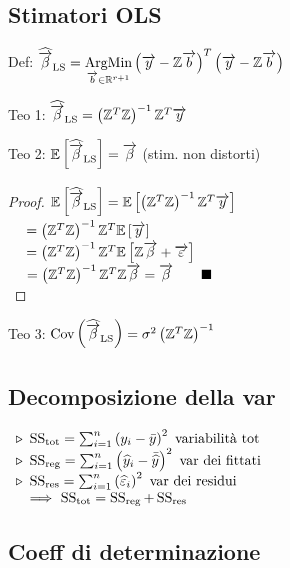 \subsection{Stimatori OLS}

Def: $\widehat{\overrightarrow{\beta}}_{\text{LS}}=\underset{\overrightarrow{b}\in\mathbb{R}^{r+1}}{\operatorname{ArgMin}}\left(\overrightarrow{y}-\mathbb{Z}\overrightarrow{b}\right)^T\left(\overrightarrow{y}-\mathbb{Z}\overrightarrow{b}\right)$

\smallskip

Teo 1: $\widehat{\overrightarrow{\beta}}_{\text{LS}}=\left(\mathbb{Z}^T\mathbb{Z}\right)^{-1}\mathbb{Z}^T\overrightarrow{y}$

\smallskip

Teo 2: $\mathbb{E}\left[\widehat{\overrightarrow{\beta}}_{\text{LS}}\right]=\overrightarrow{\beta}$ (stim. non distorti)

\begin{proof}
$\mathbb{E}\left[\widehat{\overrightarrow{\beta}}_{\text{LS}}\right]=\mathbb{E}\left[\left(\mathbb{Z}^T\mathbb{Z}\right)^{-1}\mathbb{Z}^T\overrightarrow{y}\right]$ \\
$\text{}\quad=\left(\mathbb{Z}^T\mathbb{Z}\right)^{-1}\mathbb{Z}^T\mathbb{E}\left[\overrightarrow{y}\right]$ \\
$\text{}\quad=\left(\mathbb{Z}^T\mathbb{Z}\right)^{-1}\mathbb{Z}^T\mathbb{E}\left[\mathbb{Z}\overrightarrow{\beta}+\overrightarrow{\varepsilon}\right]$ \\
$\text{}\quad=\left(\mathbb{Z}^T\mathbb{Z}\right)^{-1}\mathbb{Z}^T\mathbb{Z}\overrightarrow{\beta}=\overrightarrow{\beta}\qquad\blacksquare$ \\
\end{proof}

Teo 3: $\operatorname{Cov}\left(\widehat{\overrightarrow{\beta}}_{\text{LS}}\right)=\sigma^2\left(\mathbb{Z}^T\mathbb{Z}\right)^{-1}$

\subsection{Decomposizione della var}

$\begin{array}{l}
\triangleright\ \SSSS_{\text{tot}}=\sum_{i=1}^n\left(y_i-\bar{y}\right)^2 \text{ variabilità tot} \\
\triangleright\ \SSSS_{\text{reg}}=\sum_{i=1}^n\left(\hat{y}_i-\bar{\hat{y}}\right)^2 \text{ var dei fittati} \\
\triangleright\ \SSSS_{\text{res}}=\sum_{i=1}^n\left(\hat{\varepsilon}_i\right)^2 \text{ var dei residui} \\
\quad \Longrightarrow\  \SSSS_{\text{tot}}= \SSSS_{\text{reg}}+ \SSSS_{\text{res}}
\end{array}$

\subsection{Coeff di determinazione}

